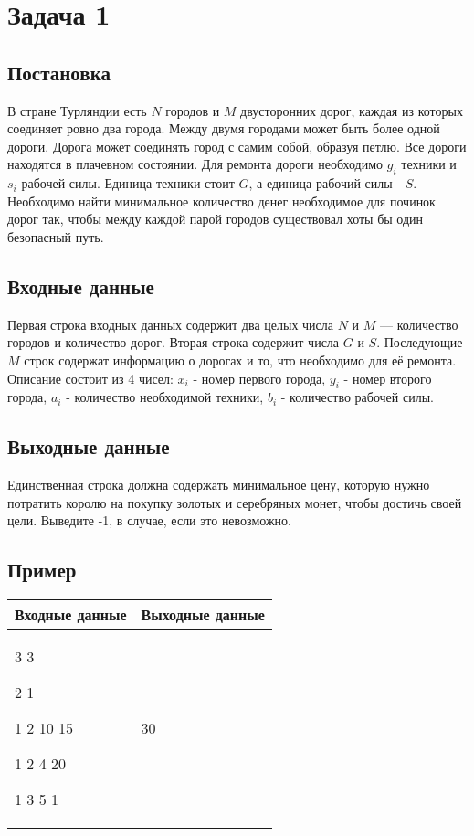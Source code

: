 \documentclass[a4]{article}
\begin{document}
\section*{Задача 1}
\label{sec:orgb62fe60}
\subsection*{Постановка}
\label{sec:org37954e9}
В стране Турляндии есть \(N\) городов и \(M\) двусторонних дорог, каждая из которых соединяет ровно два города. Между двумя городами может быть более одной дороги. Дорога
может соединять город с самим собой, образуя петлю.
Все дороги находятся в плачевном состоянии. Для ремонта дороги необходимо \(g_i\) техники и \(s_i\) рабочей силы. Единица техники стоит \(G\), а единица рабочий силы - \(S\).
Необходимо найти минимальное количество денег необходимое для починок дорог так,
чтобы между каждой парой городов существовал хоты бы один безопасный путь.

\subsection*{Входные данные}
\label{sec:orgc51833b}
Первая строка входных данных содержит два целых числа \(N\) и \(M\) — количество городов
и количество дорог. Вторая строка содержит числа \(G\) и \(S\). Последующие \(M\) строк содержат
информацию о дорогах и то, что необходимо для её ремонта. Описание состоит из 4 чисел:
\(x_i\) - номер первого города, \(y_i\) - номер второго города, \(a_i\) - количество необходимой техники,
\(b_i\) - количество рабочей силы.

\subsection*{Выходные данные}
\label{sec:org91cd1c2}
Единственная строка должна содержать минимальное цену, которую нужно потратить
королю на покупку золотых и серебряных монет, чтобы достичь своей цели. Выведите -1,
в случае, если это невозможно.

\subsection*{Пример}
\label{sec:org2aeecb4}

\begin{table}[H]
\begin{center}
\begin{tabular}{|m{4cm}|m{4cm}|}
\hline
Входные данные & Выходные данные \\ \hline
3 3

2 1

1 2 10 15

1 2 4 20

1 3 5 1
&
30
\\ \hline
\end{tabular}
\end{center}
\end{table}
\end{document}
